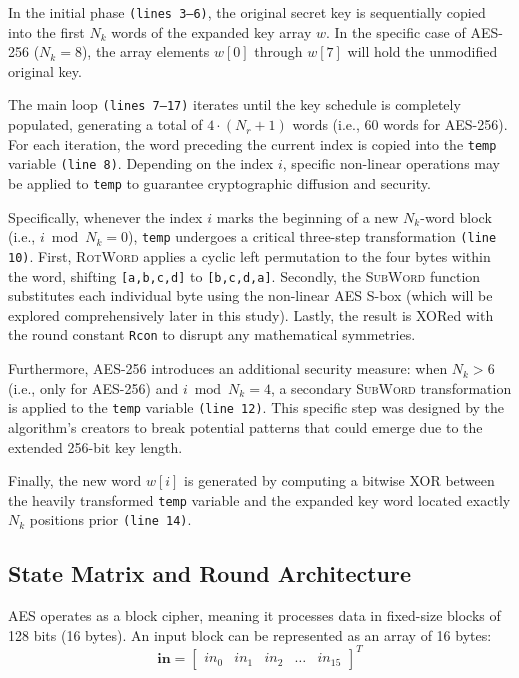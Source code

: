 \documentclass[11pt,a4paper]{report}
\begin{document}
In the initial phase \texttt{(lines 3--6)}, the original secret key is sequentially copied into the first $N_k$ words of the expanded key array $w$. 
In the specific case of AES-256 ($N_k = 8$), the array elements $w[0]$ through $w[7]$ will hold the unmodified original key.

The main loop \texttt{(lines 7--17)} iterates until the key schedule is completely populated, generating a total of $4 \cdot (N_r + 1)$ words (i.e., 60 words for AES-256). 
For each iteration, the word preceding the current index is copied into the \texttt{temp} variable \texttt{(line 8)}. 
Depending on the index $i$, specific non-linear operations may be applied to \texttt{temp} to guarantee cryptographic diffusion and security.

Specifically, whenever the index $i$ marks the beginning of a new $N_k$-word block (i.e., $i \bmod N_k = 0$), \texttt{temp} undergoes a critical three-step transformation \texttt{(line 10)}. 
First, \textsc{RotWord} applies a cyclic left permutation to the four bytes within the word, shifting \texttt{[a,b,c,d]} to \texttt{[b,c,d,a]}. 
Secondly, the \textsc{SubWord} function substitutes each individual byte using the non-linear AES S-box (which will be explored comprehensively later in this study). 
Lastly, the result is XORed with the round constant \texttt{Rcon} to disrupt any mathematical symmetries.

Furthermore, AES-256 introduces an additional security measure: when $N_k > 6$ (i.e., only for AES-256) and $i \bmod N_k = 4$, a secondary \textsc{SubWord} transformation is applied to the \texttt{temp} variable \texttt{(line 12)}. 
This specific step was designed by the algorithm's creators to break potential patterns that could emerge due to the extended 256-bit key length.

Finally, the new word $w[i]$ is generated by computing a bitwise XOR between the heavily transformed \texttt{temp} variable and the expanded key word located exactly $N_k$ positions prior \texttt{(line 14)}.

\subsection{State Matrix and Round Architecture}

AES operates as a block cipher, meaning it processes data in fixed-size blocks of 128 bits (16 bytes). 
An input block can be represented as an array of 16 bytes:
\[
\mathbf{in} = \begin{bmatrix} in_0 & in_1 & in_2 & \dots & in_{15} \end{bmatrix}^T
\]
\end{document}
